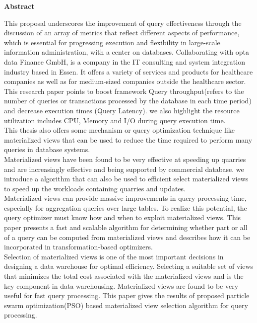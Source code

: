 \begin{center}
    \Large\textbf{Abstract}
\end{center}

\normalsize
This proposal underscores the improvement of query  effectiveness through  the  discussion of an array of metrics  that reflect different aspects of performance, which is  essential for progressing execution and flexibility in large-scale information administration, with a center on databases. Collaborating with opta data Finance GmbH, is a company in the IT consulting and system integration industry based in Essen. It offers a variety of services and products for healthcare companies as well as for medium-sized companies outside the healthcare sector. This research paper  points to boost framework Query  throughput(refers to the number of queries or transactions processed by the database in each time period) and decrease execution times (Query Latency). we also highlight the resource utilization  includes CPU, Memory and I/O during query execution time.\\
This  thesis also offers some  mechanism or query optimization technique like materialized views that can be used to reduce the time required to perform many queries in database systems.\\
Materialized views have been found to be very effective at speeding up quarries and are increasingly effective and being supported by commercial database. we introduce a algorithm that can also be used to efficient select materialized views to speed up the  workloads containing quarries and updates.\\
Materialized views can provide massive improvements in query processing time, especially for aggregation queries over large tables. To realize this potential, the query optimizer must know how and when to exploit materialized views. This paper presents a fast and scalable algorithm for determining whether part or all of a query can be computed from materialized views and describes how it can be incorporated in transformation-based optimizers.\\

Selection of materialized views is one of the most important decisions in designing a data warehouse for optimal efficiency. Selecting a suitable set of views that minimizes the total cost associated with the materialized views and is the key component in data warehousing. Materialized views are found to be very useful for fast query
processing. This paper gives the results of proposed particle swarm optimization(PSO) based materialized view selection algorithm for
query processing.\\



